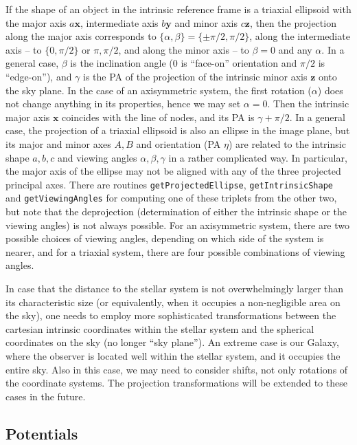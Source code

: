 \documentclass[12pt]{article}
\newcommand{\bx}{\boldsymbol{x}}
\newcommand{\by}{\boldsymbol{y}}
\newcommand{\bz}{\boldsymbol{z}}
\begin{document}
If the shape of an object in the intrinsic reference frame is a triaxial ellipsoid with the major axis $a\bx$, intermediate axis $b\by$ and minor axis $c\bz$, then the projection along the major axis corresponds to $\{\alpha,\beta\} = \{\pm\pi/2, \pi/2\}$, along the intermediate axis -- to $\{0, \pi/2\}$ or $\pi,\pi/2$, and along the minor axis -- to $\beta=0$ and any $\alpha$. In a general case, $\beta$ is the inclination angle (0 is ``face-on'' orientation and $\pi/2$ is ``edge-on''), and $\gamma$ is the PA of the projection of the intrinsic minor axis $\bz$ onto the sky plane. 
In the case of an axisymmetric system, the first rotation ($\alpha$) does not change anything in its properties, hence we may set $\alpha=0$. Then the intrinsic major axis $\bx$ coincides with the line of nodes, and its PA is $\gamma+\pi/2$.
In a general case, the projection of a triaxial ellipsoid is also an ellipse in the image plane, but its major and minor axes $A,B$ and orientation (PA $\eta$) are related to the intrinsic shape $a,b,c$ and viewing angles $\alpha,\beta,\gamma$ in a rather complicated way. In particular, the major axis of the ellipse may not be aligned with any of the three projected principal axes. There are routines \texttt{getProjectedEllipse}, \texttt{getIntrinsicShape} and \texttt{getViewingAngles} for computing one of these triplets from the other two, but note that the deprojection (determination of either the intrinsic shape or the viewing angles) is not always possible. For an axisymmetric system, there are two possible choices of viewing angles, depending on which side of the system is nearer, and for a triaxial system, there are four possible combinations of viewing angles. %

In case that the distance to the stellar system is not overwhelmingly larger than its characteristic size (or equivalently, when it occupies a non-negligible area on the sky), one needs to employ more sophisticated transformations between the cartesian intrinsic coordinates within the stellar system and the spherical coordinates on the sky (no longer ``sky plane''). An extreme case is our Galaxy, where the observer is located well within the stellar system, and it occupies the entire sky. Also in this case, we may need to consider shifts, not only rotations of the coordinate systems. The projection transformations will be extended to these cases in the future.


\subsection{Potentials}  \label{sec:PotentialDetails}
\end{document}
